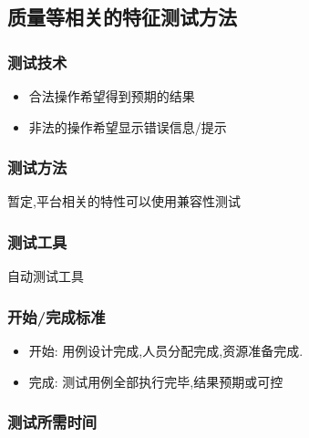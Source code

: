 \documentclass[hyperref, a4paper]{ctexart}
\providecommand{\tightlist}{%
  \setlength{\itemsep}{0pt}\setlength{\parskip}{0pt}}
\begin{document}
\hypertarget{ux8d28ux91cfux7b49ux76f8ux5173ux7684ux7279ux5f81ux6d4bux8bd5ux65b9ux6cd5}{%
\subsection{质量等相关的特征测试方法}\label{ux8d28ux91cfux7b49ux76f8ux5173ux7684ux7279ux5f81ux6d4bux8bd5ux65b9ux6cd5}}

\hypertarget{ux6d4bux8bd5ux6280ux672f-3}{%
\subsubsection{测试技术}\label{ux6d4bux8bd5ux6280ux672f-3}}

\begin{itemize}
\tightlist
\item
  合法操作希望得到预期的结果
\item
  非法的操作希望显示错误信息/提示
\end{itemize}

\hypertarget{ux6d4bux8bd5ux65b9ux6cd5-3}{%
\subsubsection{测试方法}\label{ux6d4bux8bd5ux65b9ux6cd5-3}}

暂定,平台相关的特性可以使用兼容性测试

\hypertarget{ux6d4bux8bd5ux5de5ux5177-3}{%
\subsubsection{测试工具}\label{ux6d4bux8bd5ux5de5ux5177-3}}

自动测试工具

\hypertarget{ux5f00ux59cbux5b8cux6210ux6807ux51c6-3}{%
\subsubsection{开始/完成标准}\label{ux5f00ux59cbux5b8cux6210ux6807ux51c6-3}}

\begin{itemize}
\tightlist
\item
  开始: 用例设计完成,人员分配完成,资源准备完成.
\item
  完成: 测试用例全部执行完毕,结果预期或可控
\end{itemize}

\hypertarget{ux6d4bux8bd5ux6240ux9700ux65f6ux95f4-3}{%
\subsubsection{测试所需时间}\label{ux6d4bux8bd5ux6240ux9700ux65f6ux95f4-3}}
\end{document}
